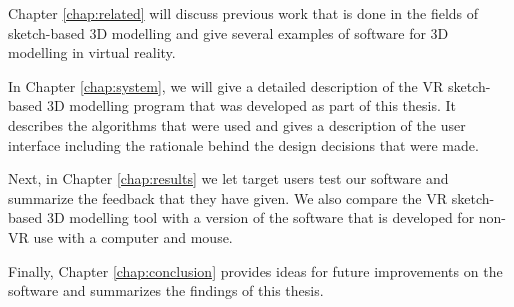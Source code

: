 Chapter \ref{chap:related} will discuss previous work that is done in the fields of sketch-based 3D modelling and give several examples of software for 3D modelling in virtual reality. 

In Chapter \ref{chap:system}, we will give a detailed description of the VR sketch-based 3D modelling program that was developed as part of this thesis. It describes the algorithms that were used and gives a description of the user interface including the rationale behind the design decisions that were made. 

Next, in Chapter \ref{chap:results} we let target users test our software and summarize the feedback that they have given. We also compare the VR sketch-based 3D modelling tool with a version of the software that is developed for non-VR use with a computer and mouse. 

Finally, Chapter \ref{chap:conclusion} provides ideas for future improvements on the software and summarizes the findings of this thesis.
